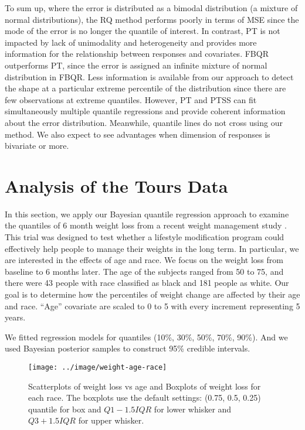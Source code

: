 \documentclass[12pt]{article}
\begin{document}
To sum up, where the error is distributed as a bimodal distribution (a
mixture of normal distributions), the RQ method performs poorly in
terms of MSE since the mode of the error is no longer the quantile of
interest. In contrast, PT is not impacted by lack of unimodality and
heterogeneity and provides more information for the relationship
between responses and covariates. FBQR outperforms PT, since the error
is assigned an infinite mixture of normal distribution in FBQR. Less
information is available from our approach to detect the shape at a
particular extreme percentile of the distribution since there are few
observations at extreme quantiles. However, PT and PTSS can fit
simultaneously multiple quantile regressions and provide coherent
information about the error distribution. Meanwhile, quantile lines do
not cross using our method.  We also expect to see advantages when
dimension of responses is bivariate or more.


\section{Analysis of the Tours Data}
\label{sec:tours}
In this section, we apply our Bayesian quantile regression approach to
examine the quantiles of 6 month weight loss from a recent weight
management study \citep{perri2008extended}.  This trial was designed
to test whether a lifestyle modification program could effectively
help people to manage their weights in the long term.  In particular,
we are interested in the effects of age and race.  We focus on the
weight loss from baseline to 6 months later. The age of the subjects
ranged from 50 to 75, and there were 43 people with race classified as
black and 181 people as white.  Our goal is to determine how the
percentiles of weight change are affected by their age and race.
``Age'' covariate are scaled to 0 to 5 with every increment
representing 5 years.

We fitted regression models for quantiles (10\%, 30\%, 50\%, 70\%,
90\%). And we used Bayesian posterior samples to construct 95\%
credible intervals.

\begin{figure}[htbp]
  \centerline{\texttt{[image: ../image/weight-age-race]}}
  \caption[]{\label{fig:tours} Scatterplots of weight loss vs age and
    Boxplots of weight loss for each race.  The boxplots use the
    default settings: (0.75, 0.5, 0.25) quantile for box and
    $Q1-1.5IQR$ for lower whisker and $Q3+1.5IQR$ for upper whisker. }
\end{figure}
\end{document}
